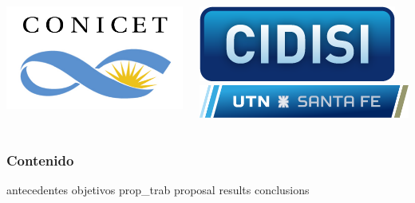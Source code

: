 \documentclass{beamer}
\begin{document}
\begin{frame}[plain]
\begin{columns}
		\begin{column}{30mm}
			\begin{center}
					\includegraphics[scale=0.15]{logos/logo_conicet.pdf}
			\end{center}
		\end{column}
		
		\hspace*{-20mm}
		
		\begin{column}{30mm}
		\vspace{-1mm}
			\begin{center}
					\includegraphics[scale=0.10]{logos/logo_cidisi.png}\\[3pt]
					\includegraphics[scale=0.15]{logos/logo_UTN_vect.pdf}
			\end{center}
		\end{column}

	\end{columns}
\end{frame}

\begin{frame}[plain]
  \frametitle{Contenido}  
  \begin{scriptsize}
  \tableofcontents
  \end{scriptsize}
\end{frame}


{antecedentes}
{objetivos}
{prop_trab}
{proposal} %
{results} %
{conclusions} 
\end{document}
